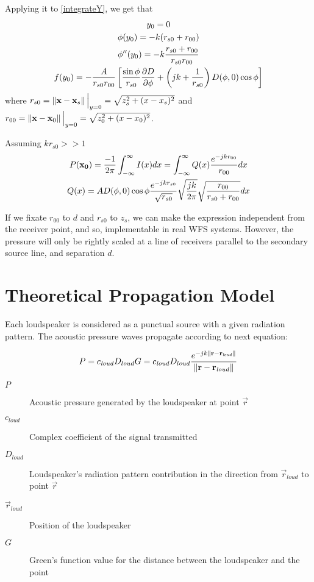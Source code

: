 Applying it to \autoref{integrateY}, we get that
\begin{gather}
	y_0 = 0 \\
	\phi(y_0) = -k(r_{s0} + r_{00}) \\
	\phi''(y_0) = -k\frac{r_{s0} + r_{00}}{r_{s0} r_{00}} \\
	f(y_0) = -\frac{A}{r_{s0} r_{00}}\left[ \frac{\sin\phi}{r_{s0}} \frac{\partial\Diag}{\partial\phi} + \left(jk + \frac{1}{r_{s0}}\right) \Diag(\phi, 0) \cos\phi \right]
\end{gather}
where $r_{s0} = \left\| \mathbf{x} - \mathbf{x}_s \right\|\Big\vert_{y = 0} = \sqrt{z_s^2 + (x - x_s)^2}$ and $r_{00} = \left\| \mathbf{x} - \mathbf{x}_0 \right\|\Big\vert_{y = 0} = \sqrt{z_0^2 + (x - x_0)^2}$.

Assuming $kr_{s0} >> 1$
\begin{gather}
P(\vec{x_0}) = \frac{-1}{2\pi} \int_{-\infty}^{\infty} I(x) dx = \int_{-\infty}^{\infty} Q(x) \frac{e^{-jkr_{00}}}{r_{00}} dx \\ Q(x) = A \Diag(\phi, 0) \cos\phi \frac{e^{-jk r_{s0}}}{\sqrt{r_{s0}}} \sqrt{\frac{jk}{2\pi}} \sqrt{\frac{r_{00}}{r_{s0} + r_{00}}} dx
\end{gather}

If we fixate $r_{00}$ to $d$ and $r_{s0}$ to $z_s$, we can make the expression independent from the receiver point, and so, implementable in real WFS systems. However, the pressure will only be rightly scaled at a line of receivers parallel to the secondary source line, and separation $d$.

\section{Theoretical Propagation Model}
\label{TheoreticalModelLabel}

Each loudspeaker is considered as a punctual source with a given radiation pattern. The acoustic pressure waves propagate according to next equation:

\begin{equation}
P = c_\mathit{loud} D_{loud} G = c_\mathit{loud} D_{loud} \frac{e^{-j k \left\| \mathbf{r} - \mathbf{r}_\mathit{loud} \right\|}}{\left\| \mathbf{r} - \mathbf{r}_\mathit{loud} \right\|}
\end{equation}

\begin{description}
	\item[$P$] Acoustic pressure generated by the loudspeaker at point $\vec{r}$
	\item[$c_\mathit{loud}$] Complex coefficient of the signal transmitted %
	\item[$D_{loud}$] Loudspeaker's radiation pattern contribution in the direction from $\vec{r}_\mathit{loud}$ to point $\vec{r}$%
	\item[$\vec{r}_{\mathit{loud}}$] Position of the loudspeaker
	\item[$G$] Green's function value for the distance between the loudspeaker and the point %
\end{description}

